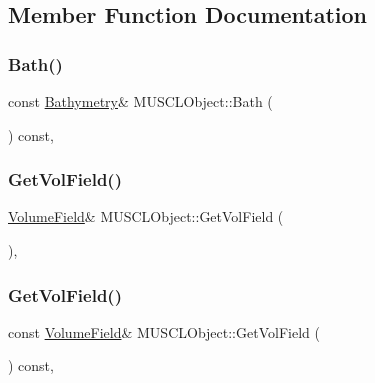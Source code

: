 \subsection{Member Function Documentation}
\mbox{\label{structMUSCLObject_a4746396c5f8cb793b81ed847e372c71c}} 
\subsubsection{\texorpdfstring{Bath()}{Bath()}}
{\footnotesize\ttfamily const \hyperlink{structBathymetry}{Bathymetry}\& M\+U\+S\+C\+L\+Object\+::\+Bath (\begin{DoxyParamCaption}{ }\end{DoxyParamCaption}) const\hspace{0.3cm}{\ttfamily [inline]}, {\ttfamily [noexcept]}}

\mbox{\label{structMUSCLObject_a9ba24ae90a94c7d80f651ce26053b303}} 
\subsubsection{\texorpdfstring{Get\+Vol\+Field()}{GetVolField()}\hspace{0.1cm}{\footnotesize\ttfamily [1/2]}}
{\footnotesize\ttfamily \hyperlink{ValueField_8h_a329043a10c46a8722ea79ba24fe40f97}{Volume\+Field}\& M\+U\+S\+C\+L\+Object\+::\+Get\+Vol\+Field (\begin{DoxyParamCaption}{ }\end{DoxyParamCaption})\hspace{0.3cm}{\ttfamily [inline]}, {\ttfamily [noexcept]}}

\mbox{\label{structMUSCLObject_a8b96302a64cceadec4e0126b68649814}} 
\subsubsection{\texorpdfstring{Get\+Vol\+Field()}{GetVolField()}\hspace{0.1cm}{\footnotesize\ttfamily [2/2]}}
{\footnotesize\ttfamily const \hyperlink{ValueField_8h_a329043a10c46a8722ea79ba24fe40f97}{Volume\+Field}\& M\+U\+S\+C\+L\+Object\+::\+Get\+Vol\+Field (\begin{DoxyParamCaption}{ }\end{DoxyParamCaption}) const\hspace{0.3cm}{\ttfamily [inline]}, {\ttfamily [noexcept]}}

